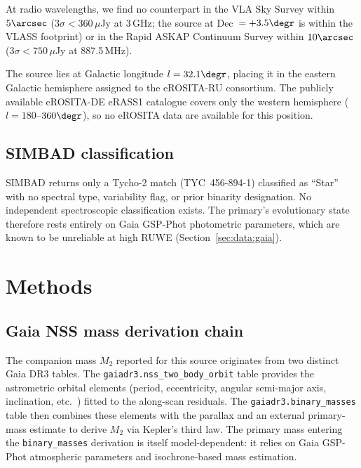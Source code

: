 \documentclass[usenatbib,fleqn]{mnras}
\begin{document}
At radio wavelengths, we find no counterpart in the VLA Sky Survey
\citep[VLASS;][]{Lacy2020} within $5\arcsec$ ($3\sigma <
360\,\mu$Jy at 3\,GHz; the source at Dec~$= +3.5\degr$ is within
the VLASS footprint) or in the Rapid ASKAP Continuum Survey
\citep[RACS;][]{McConnell2020} within $10\arcsec$ ($3\sigma <
750\,\mu$Jy at 887.5\,MHz).

The source lies at Galactic longitude $l = 32.1\degr$, placing it
in the eastern Galactic hemisphere assigned to the eROSITA-RU
consortium.  The publicly available eROSITA-DE eRASS1 catalogue
\citep{Merloni2024} covers only the western hemisphere
($l = 180$--$360\degr$), so no eROSITA data are available for
this position.

\subsection{SIMBAD classification}
\label{sec:data:simbad}

SIMBAD \citep{Wenger2000} returns only a Tycho-2 match
(TYC~456-894-1) classified as ``Star'' with no spectral type,
variability flag, or prior binarity designation.  No independent
spectroscopic classification exists.  The primary's evolutionary
state therefore rests entirely on Gaia GSP-Phot photometric
parameters, which are known to be unreliable at high RUWE
(Section~\ref{sec:data:gaia}).

\section{Methods}
\label{sec:methods}

\subsection{Gaia NSS mass derivation chain}
\label{sec:methods:nss}

The companion mass $M_2$ reported for this source originates from
two distinct Gaia DR3 tables.  The \texttt{gaiadr3.nss\_two\_body\_orbit}
table provides the astrometric orbital elements (period, eccentricity,
angular semi-major axis, inclination, etc.\ ) fitted to the along-scan
residuals.  The \texttt{gaiadr3.binary\_masses} table then combines these
elements with the parallax and an external primary-mass estimate to
derive $M_2$ via Kepler's third law.  The primary mass entering the
\texttt{binary\_masses} derivation is itself model-dependent: it relies
on Gaia GSP-Phot atmospheric parameters and isochrone-based mass
estimation.
\end{document}
